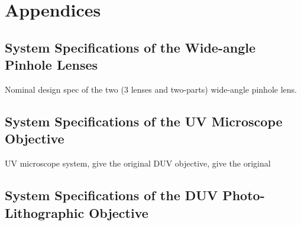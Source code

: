 
\chapter{Appendices} %
\label{Appendices} %
\graphicspath{ {./Appendix/figures/} }  %
\captionsetup[figure]{labelfont=bf}
\captionsetup{margin=1.5em}
\captionsetup[table]{labelfont=bf}





\begin{comment}
\section{Spherical aberration derivation}
derivation of the thinlens Spherical aberration case for the intro, magnifier one. 

\newpage

\section{landscape cases}
What do I mean by this? Is it about better descriptions of what happened for each landscape cases? To be remembered. 
\newpage
\end{comment}
\section{System Specifications of the Wide-angle Pinhole Lenses} 
\label{apdx: wide-angle-specs}
Nominal design spec of the two (3 lenses and two-parts) wide-angle pinhole lens. 

\newpage
\section{System Specifications of the UV Microscope Objective} 
\label{apdx: uv-microscope-spec}
UV microscope system, give the original 
DUV objective, give the original

\newpage
\section{System Specifications of the DUV Photo-Lithographic Objective}
\label{apdx: duv-litho-spec}

